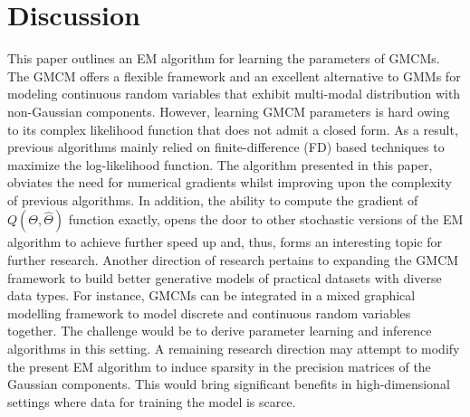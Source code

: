 \documentclass{article}
\theoremstyle{plain}
\theoremstyle{definition}
\theoremstyle{remark}
\begin{document}
\section{Discussion}\label{sec:Discussion}
This paper outlines an EM algorithm for learning the parameters of GMCMs. The GMCM offers a flexible framework and an excellent alternative to GMMs for modeling continuous random variables that exhibit multi-modal distribution with non-Gaussian components. However, learning GMCM parameters is hard owing to its complex likelihood function that does not admit a closed form. As a result, previous algorithms mainly relied on finite-difference (FD) based techniques to maximize the log-likelihood function. The algorithm presented in this paper, obviates the need for numerical gradients whilst improving upon the complexity of previous algorithms. In addition, the ability to compute the gradient of $Q(\Theta,\hat{\Theta})$ function exactly, opens the door to other stochastic versions of the EM algorithm to achieve further speed up and, thus, forms an interesting topic for further research. Another direction of research pertains to expanding the GMCM framework to build better generative models of practical datasets with diverse data types. For instance, GMCMs can be integrated in a mixed graphical modelling framework to model discrete and continuous random variables together. The challenge would be to derive parameter learning and inference algorithms in this setting. A remaining research direction may attempt to modify the present EM algorithm to induce sparsity in the precision matrices of the Gaussian components. This would bring significant benefits in high-dimensional settings where data for training the model is scarce. 

\section*{\refname}








 

\end{document}
